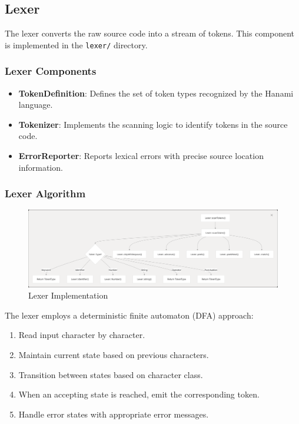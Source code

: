 \documentclass[conference]{IEEEtran}
\begin{document}
\subsection{Lexer}
The lexer converts the raw source code into a stream of tokens. This component is implemented in the \texttt{lexer/} directory.

\subsubsection{Lexer Components}
\begin{itemize}
    \item \textbf{TokenDefinition}: Defines the set of token types recognized by the Hanami language.
    \item \textbf{Tokenizer}: Implements the scanning logic to identify tokens in the source code.
    \item \textbf{ErrorReporter}: Reports lexical errors with precise source location information.
\end{itemize}

\subsubsection{Lexer Algorithm}
\begin{figure}[H]
        \centering
        \includegraphics[width=1\linewidth]{lexer_imp.png}
        \caption{Lexer Implementation}
        \label{fig:enter-label}
    \end{figure}
The lexer employs a deterministic finite automaton (DFA) approach:
\begin{enumerate}
    \item Read input character by character.
    \item Maintain current state based on previous characters.
        \item Transition between states based on character class.
    \item When an accepting state is reached, emit the corresponding token.
    \item Handle error states with appropriate error messages.
\end{enumerate}
\end{document}
